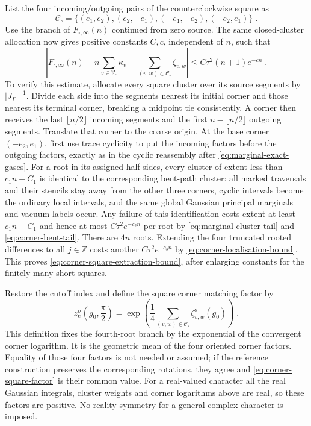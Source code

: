 \documentclass[11pt]{article}
\begin{document}
List the four incoming/outgoing pairs of the counterclockwise square as
\begin{equation}\label{eq:corner-square-pairs}
    \mathscr C_\square=
        \{(e_1,e_2),(e_2,-e_1),(-e_1,-e_2),(-e_2,e_1)\}\;.
\end{equation}
Use the branch of $F_{\square,\infty}(n)$ continued from zero source. The same closed-cluster allocation now gives positive constants $C,c$, independent of $n$, such that
\begin{equation}\label{eq:corner-square-extraction-bound}
    \left|F_{\square,\infty}(n)
        -n\sum_{v\in \mathscr V_\square}\kappa_v
        -\sum_{(v,w)\in \mathscr C_\square}\zeta_{v,w}\right|
        \leq C\tau^2(n+1)e^{-cn}\;.
\end{equation}
To verify this estimate, allocate every square cluster over its source segments by $|J_\Gamma|^{-1}$. Divide each side into the segments nearest its initial corner and those nearest its terminal corner, breaking a midpoint tie consistently. A corner then receives the last $\lfloor n/2\rfloor$ incoming segments and the first $n-\lfloor n/2\rfloor$ outgoing segments. Translate that corner to the coarse origin. At the base corner $(-e_2,e_1)$, first use trace cyclicity to put the incoming factors before the outgoing factors, exactly as in the cyclic reassembly after \eqref{eq:marginal-exact-gases}. For a root in its assigned half-sides, every cluster of extent less than $c_1n-C_1$ is identical to the corresponding bent-path cluster: all marked traversals and their stencils stay away from the other three corners, cyclic intervals become the ordinary local intervals, and the same global Gaussian principal marginals and vacuum labels occur. Any failure of this identification costs extent at least $c_1n-C_1$ and hence at most $C\tau^2e^{-c_2n}$ per root by \eqref{eq:marginal-cluster-tail} and \eqref{eq:corner-bent-tail}. There are $4n$ roots. Extending the four truncated rooted differences to all $j\in\mathbb Z$ costs another $C\tau^2e^{-c_3n}$ by \eqref{eq:corner-localisation-bound}. This proves \eqref{eq:corner-square-extraction-bound}, after enlarging constants for the finitely many short squares.

Restore the cutoff index and define the square corner matching factor by
\begin{equation}\label{eq:corner-square-factor}
    \boxed{\displaystyle
        z_{\mathrm c}^{\sigma}\!\left(g_0,\frac{\pi}{2}\right)
            =\exp\left(\frac{1}{4}
                \sum_{(v,w)\in \mathscr C_\square}
                    \zeta_{v,w}^{\sigma}(g_0)\right)}\;.
\end{equation}
This definition fixes the fourth-root branch by the exponential of the convergent corner logarithm. It is the geometric mean of the four oriented corner factors. Equality of those four factors is not needed or assumed; if the reference construction preserves the corresponding rotations, they agree and \eqref{eq:corner-square-factor} is their common value. For a real-valued character all the real Gaussian integrals, cluster weights and corner logarithms above are real, so these factors are positive. No reality symmetry for a general complex character is imposed.
\end{document}

